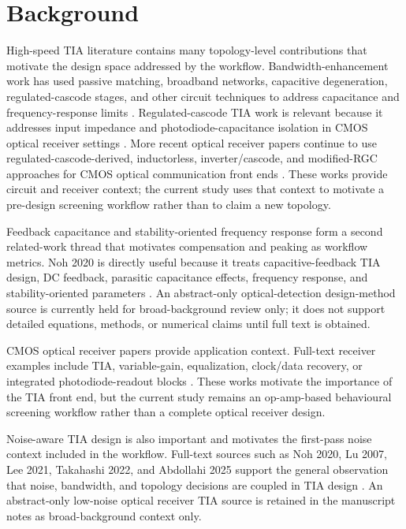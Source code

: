 \section{Background}

High-speed TIA literature contains many topology-level contributions that motivate the design space addressed by the workflow. Bandwidth-enhancement work has used passive matching, broadband networks, capacitive degeneration, regulated-cascode stages, and other circuit techniques to address capacitance and frequency-response limits \citep{ANALUI_2004_BW_ENHANCEMENT,LU_2007_BROADBAND_TIA}. Regulated-cascode TIA work is relevant because it addresses input impedance and photodiode-capacitance isolation in CMOS optical receiver settings \citep{PARK_YOO_2004_RGC_TIA}. More recent optical receiver papers continue to use regulated-cascode-derived, inductorless, inverter/cascode, and modified-RGC approaches for CMOS optical communication front ends \citep{XU_2011_INDUCTORLESS_TIA,LEE_2021_4GHZ_SDT_VG_TIA,TAKAHASHI_2022_LOCAL_FEEDBACK_RGC,PAN_LUO_2022_20GBPS_TIA,ABDOLLAHI_2025_MDFRGC_TIA}. These works provide circuit and receiver context; the current study uses that context to motivate a pre-design screening workflow rather than to claim a new topology.

Feedback capacitance and stability-oriented frequency response form a second related-work thread that motivates compensation and peaking as workflow metrics. Noh 2020 is directly useful because it treats capacitive-feedback TIA design, DC feedback, parasitic capacitance effects, frequency response, and stability-oriented parameters \citep{NOH_2020_CF_TIA_DC_LOOP}.
An abstract-only optical-detection design-method source is currently held for broad-background review only; it does not support detailed equations, methods, or numerical claims until full text is obtained.

CMOS optical receiver papers provide application context. Full-text receiver examples include TIA, variable-gain, equalization, clock/data recovery, or integrated photodiode-readout blocks \citep{PAN_2022_26GBPS_RX,MESGARI_2024_MULTI_DOT_PIN_RX}. These works motivate the importance of the TIA front end, but the current study remains an op-amp-based behavioural screening workflow rather than a complete optical receiver design.

Noise-aware TIA design is also important and motivates the first-pass noise context included in the workflow. Full-text sources such as Noh 2020, Lu 2007, Lee 2021, Takahashi 2022, and Abdollahi 2025 support the general observation that noise, bandwidth, and topology decisions are coupled in TIA design \citep{NOH_2020_CF_TIA_DC_LOOP,LU_2007_BROADBAND_TIA,LEE_2021_4GHZ_SDT_VG_TIA,TAKAHASHI_2022_LOCAL_FEEDBACK_RGC,ABDOLLAHI_2025_MDFRGC_TIA}.
An abstract-only low-noise optical receiver TIA source is retained in the manuscript notes as broad-background context only.

